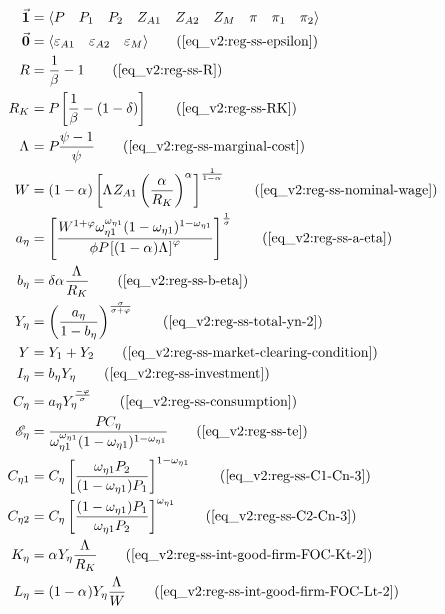 \documentclass[../thesis.tex]{subfiles}
\begin{document}
	\begin{align}
		\vec{\bm{1}} &= \langle \begin{matrix} P & P_{1} & P_{2} & Z_{A1} & Z_{A2} & Z_{M} & \pi & \pi_{1} & \pi_{2} \end{matrix} \rangle \label{eq_v2:reg-unity-vector}
		\\
		\vec{\bm{0}} &= \langle \begin{matrix} \varepsilon_{A1} & \varepsilon_{A2} & \varepsilon_{M} \end{matrix} \rangle \tag{\ref{eq_v2:reg-ss-epsilon}}
		\\
		R &= \frac{1}{\beta} - 1 \tag{\ref{eq_v2:reg-ss-R}}
		\\
		R_K &= P_{} \left[ \frac{1}{\beta} - (1-\delta) \right] \tag{\ref{eq_v2:reg-ss-RK}}
		\\
		\Lambda_{} &= P_{} \frac{\psi-1}{\psi} \tag{\ref{eq_v2:reg-ss-marginal-cost}}
		\\
		W &= (1-{\alpha_{}}) \left[ \Lambda_{} Z_{A1} \left( \frac{{\alpha_{}}}{R_K} \right)^{{\alpha_{}}} \right]^\frac{1}{1-{\alpha_{}}} \tag{\ref{eq_v2:reg-ss-nominal-wage}}
		\\ %
		a_{\eta} &= \left[ \frac{W^{1 +\varphi} \omega_{\eta 1}^{\omega_{\eta 1}} (1 -\omega_{\eta 1})^{1 -\omega_{\eta 1}}}{\phi P_{} \left[ (1 -\alpha_{}) \Lambda_{} \right]^{\varphi}} \right]^{\frac{1}{\sigma}} \tag{\ref{eq_v2:reg-ss-a-eta}}
		\\
		b_{\eta} &= \delta {\alpha_{}} \frac{\Lambda_{}}{R_K} \tag{\ref{eq_v2:reg-ss-b-eta}}
		\\
		Y_{\eta} &= \left( \frac{a_{\eta}}{1 - b_{\eta}} \right)^{\frac{\sigma}{\sigma + \varphi}} \tag{\ref{eq_v2:reg-ss-total-yn-2}}
		\\
		Y &= Y_{1} + Y_{2} \tag{\ref{eq_v2:reg-ss-market-clearing-condition}}
		\\
		I_{\eta} &= b_{\eta} Y_{\eta} \tag{\ref{eq_v2:reg-ss-investment}}
		\\
		C_{\eta} &= a_{\eta} Y_{\eta}^{\frac{-\varphi}{\sigma}} \tag{\ref{eq_v2:reg-ss-consumption}}
		\\
		\te[] &= \frac{P_{} C_{\eta}}{\omega_{\eta 1}^{\omega_{\eta 1}} (1 -\omega_{\eta 1})^{1 -\omega_{\eta 1}}} \tag{\ref{eq_v2:reg-ss-te}}
		\\
		C_{\eta 1} &= C_{\eta} \left[ \frac{\omega_{\eta 1} P_{2}}{(1 - \omega_{\eta 1}) P_{1}} \right]^{1-\omega_{\eta 1}} \tag{\ref{eq_v2:reg-ss-C1-Cn-3}}
		\\
		C_{\eta 2} &= C_{\eta} \left[ \frac{(1 - \omega_{\eta 1}) P_{1}}{\omega_{\eta 1} P_{2}} \right]^{\omega_{\eta 1}} \tag{\ref{eq_v2:reg-ss-C2-Cn-3}}
		\\
		K_{\eta} &= {\alpha_{}} Y_{\eta} \frac{\Lambda_{}}{R_K} \tag{\ref{eq_v2:reg-ss-int-good-firm-FOC-Kt-2}}
		\\
		L_{\eta} &= (1-{\alpha_{}}) Y_{\eta} \frac{\Lambda_{}}{W} \tag{\ref{eq_v2:reg-ss-int-good-firm-FOC-Lt-2}}
	\end{align}
\end{document}
